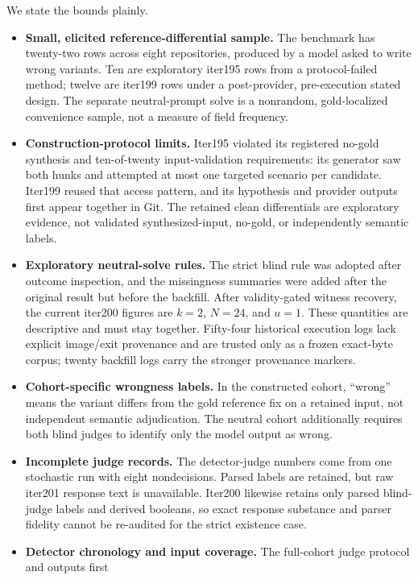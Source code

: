 \documentclass[11pt]{article}
\begin{document}
We state the bounds plainly.
\begin{itemize}
  \setlength{\itemsep}{2pt}
  \setlength{\parsep}{0pt}
  \setlength{\parskip}{0pt}
  \item \textbf{Small, elicited reference-differential sample.} The benchmark has twenty-two rows across
  eight repositories, produced by a model asked to write wrong variants. Ten are exploratory iter195 rows
  from a protocol-failed method; twelve are iter199 rows under a post-provider, pre-execution stated design.
  The separate neutral-prompt solve is a
  nonrandom, gold-localized convenience sample, not a measure of field frequency.
  \item \textbf{Construction-protocol limits.} Iter195 violated its registered no-gold synthesis and
  ten-of-twenty input-validation requirements: its generator saw both hunks and attempted at most one targeted
  scenario per candidate. Iter199 reused that access pattern, and its hypothesis and provider outputs first
  appear together in Git. The retained clean differentials are exploratory evidence, not validated
  synthesized-input, no-gold, or independently semantic labels.
  \item \textbf{Exploratory neutral-solve rules.} The strict blind rule was adopted after outcome
  inspection, and the missingness summaries were added after the original result but before the backfill.
  After validity-gated witness recovery, the current iter200 figures are $k=2$, $N=24$, and $u=1$.
  These quantities are descriptive and must stay together. Fifty-four historical execution logs lack
  explicit image/exit provenance and are trusted only as a frozen exact-byte corpus; twenty backfill logs
  carry the stronger provenance markers.
  \item \textbf{Cohort-specific wrongness labels.} In the constructed cohort, ``wrong'' means the variant
  differs from the gold reference fix on a retained input, not independent semantic adjudication. The
  neutral cohort additionally requires both blind judges to identify only the model output as wrong.
  \item \textbf{Incomplete judge records.} The detector-judge numbers come from one stochastic run with
  eight nondecisions. Parsed labels are retained, but raw iter201 response text is unavailable. Iter200
  likewise retains only parsed blind-judge labels and derived booleans, so exact response substance and
  parser fidelity cannot be re-audited for the strict existence case.
  \item \textbf{Detector chronology and input coverage.} The full-cohort judge protocol and outputs first

\end{itemize}
\end{document}
